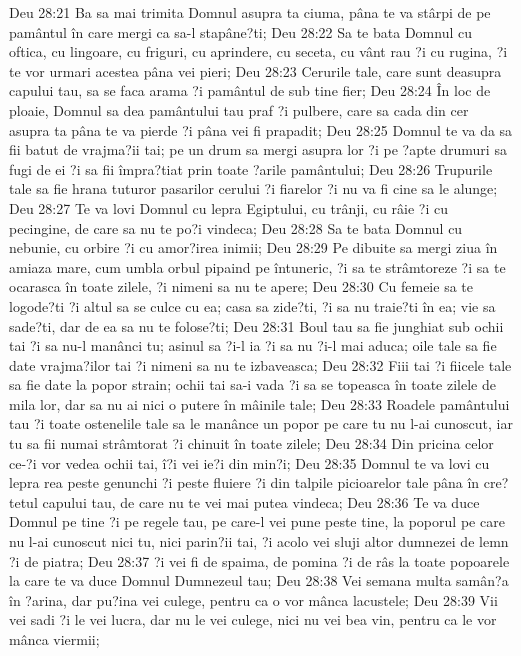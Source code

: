 Deu 28:21  Ba sa mai trimita Domnul asupra ta ciuma, pâna te va stârpi de pe pamântul în care mergi ca sa-l stapâne?ti;
Deu 28:22  Sa te bata Domnul cu oftica, cu lingoare, cu friguri, cu aprindere, cu seceta, cu vânt rau ?i cu rugina, ?i te vor urmari acestea pâna vei pieri;
Deu 28:23  Cerurile tale, care sunt deasupra capului tau, sa se faca arama ?i pamântul de sub tine fier;
Deu 28:24  În loc de ploaie, Domnul sa dea pamântului tau praf ?i pulbere, care sa cada din cer asupra ta pâna te va pierde ?i pâna vei fi prapadit;
Deu 28:25  Domnul te va da sa fii batut de vrajma?ii tai; pe un drum sa mergi asupra lor ?i pe ?apte drumuri sa fugi de ei ?i sa fii împra?tiat prin toate ?arile pamântului;
Deu 28:26  Trupurile tale sa fie hrana tuturor pasarilor cerului ?i fiarelor ?i nu va fi cine sa le alunge;
Deu 28:27  Te va lovi Domnul cu lepra Egiptului, cu trânji, cu râie ?i cu pecingine, de care sa nu te po?i vindeca;
Deu 28:28  Sa te bata Domnul cu nebunie, cu orbire ?i cu amor?irea inimii;
Deu 28:29  Pe dibuite sa mergi ziua în amiaza mare, cum umbla orbul pipaind pe întuneric, ?i sa te strâmtoreze ?i sa te ocarasca în toate zilele, ?i nimeni sa nu te apere;
Deu 28:30  Cu femeie sa te logode?ti ?i altul sa se culce cu ea; casa sa zide?ti, ?i sa nu traie?ti în ea; vie sa sade?ti, dar de ea sa nu te folose?ti;
Deu 28:31  Boul tau sa fie junghiat sub ochii tai ?i sa nu-l manânci tu; asinul sa ?i-l ia ?i sa nu ?i-l mai aduca; oile tale sa fie date vrajma?ilor tai ?i nimeni sa nu te izbaveasca;
Deu 28:32  Fiii tai ?i fiicele tale sa fie date la popor strain; ochii tai sa-i vada ?i sa se topeasca în toate zilele de mila lor, dar sa nu ai nici o putere în mâinile tale;
Deu 28:33  Roadele pamântului tau ?i toate ostenelile tale sa le manânce un popor pe care tu nu l-ai cunoscut, iar tu sa fii numai strâmtorat ?i chinuit în toate zilele;
Deu 28:34  Din pricina celor ce-?i vor vedea ochii tai, î?i vei ie?i din min?i;
Deu 28:35  Domnul te va lovi cu lepra rea peste genunchi ?i peste fluiere ?i din talpile picioarelor tale pâna în cre?tetul capului tau, de care nu te vei mai putea vindeca;
Deu 28:36  Te va duce Domnul pe tine ?i pe regele tau, pe care-l vei pune peste tine, la poporul pe care nu l-ai cunoscut nici tu, nici parin?ii tai, ?i acolo vei sluji altor dumnezei de lemn ?i de piatra;
Deu 28:37  ?i vei fi de spaima, de pomina ?i de râs la toate popoarele la care te va duce Domnul Dumnezeul tau;
Deu 28:38  Vei semana multa samân?a în ?arina, dar pu?ina vei culege, pentru ca o vor mânca lacustele;
Deu 28:39  Vii vei sadi ?i le vei lucra, dar nu le vei culege, nici nu vei bea vin, pentru ca le vor mânca viermii;
